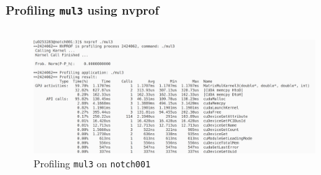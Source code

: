 \begin{frame}
   \frametitle{Profiling \texttt{mul3} using nvprof}
     \begin{columns}
    \begin{figure}[H]
       \centering
          \includegraphics[width=0.95\textwidth]{./img/nvprof-mul3.png}
          \caption{\small{Profiling \texttt{mul3} on \texttt{notch001}}}
     \end{figure}
     \end{columns}
\end{frame}	


